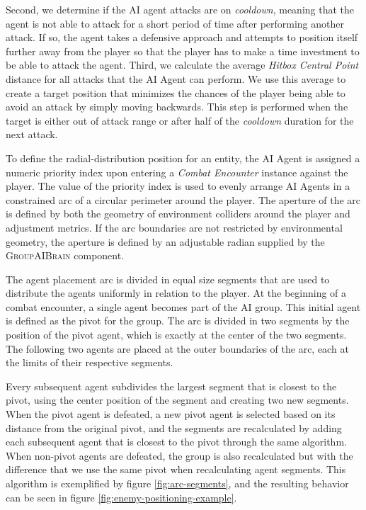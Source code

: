 
Second, we determine if the AI agent attacks are on \emph{cooldown}, meaning that the agent is not able to attack for a short period of time after performing another attack. If so, the agent takes a defensive approach and attempts to position itself further away from the player so that the player has to make a time investment to be able to attack the agent. Third, we calculate the average \emph{Hitbox Central Point} distance for all attacks that the AI Agent can perform. We use this average to create a target position that minimizes the chances of the player being able to avoid an attack by simply moving backwards. This step is performed when the target is either out of attack range or after half of the \emph{cooldown} duration for the next attack.

To define the radial-distribution position for an entity, the AI Agent is assigned a numeric priority index upon entering a \emph{Combat Encounter} instance against the player. The value of the priority index is used to evenly arrange AI Agents in a constrained arc of a circular perimeter around the player. The aperture of the arc is defined by both the geometry of environment colliders around the player and adjustment metrics. If the arc boundaries are not restricted by environmental geometry, the aperture is defined by an adjustable radian supplied by the \textsc{GroupAIBrain} component.

The agent placement arc is divided in equal size segments that are used to distribute the agents uniformly in relation to the player. At the beginning of a combat encounter, a single agent becomes part of the AI group. This initial agent is defined as the pivot for the group. The arc is divided in two segments by the position of the pivot agent, which is exactly at the center of the two segments. The following two agents are placed at the outer boundaries of the arc, each at the limits of their respective segments.

Every subsequent agent subdivides the largest segment that is closest to the pivot, using the center position of the segment and creating two new segments. When the pivot agent is defeated, a new pivot agent is selected based on its distance from the original pivot, and the segments are recalculated by adding each subsequent agent that is closest to the pivot through the same algorithm. When non-pivot agents are defeated, the group is also recalculated but with the difference that we use the same pivot when recalculating agent segments. This algorithm is exemplified by figure \ref{fig:arc-segments}, and the resulting behavior can be seen in figure \ref{fig:enemy-positioning-example}.


